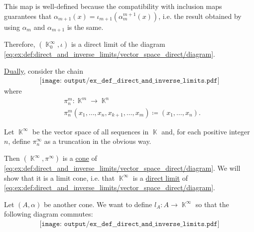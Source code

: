 \begin{example}
\begin{thmenum}
    This map is well-defined because the compatibility with inclusion maps guarantees that \( \alpha_{m+1}(x) = \iota_{m+1}(\alpha^{m+1}_m(x)) \), i.e. the result obtained by using \( \alpha_m \) and \( \alpha_{m+1} \) is the same.

    Therefore, \( (\BbbK_0^\infty, \iota) \) is a direct limit of the diagram \eqref{eq:ex:def:direct_and_inverse_limits/vector_space_direct/diagram}.

     \hyperref[thm:categorical_principle_of_duality]{Dually}, consider the chain
    \begin{equation}\label{eq:ex:def:direct_and_inverse_limits/vector_space_inverse/diagram}
      \begin{aligned}
        \texttt{[image: output/ex\_\_def\_\_direct\_and\_inverse\_limits.pdf]}
      \end{aligned}
    \end{equation}
    where
    \begin{equation*}
      \begin{aligned}
        &\pi_n^m: \BbbK^m \to \BbbK^n \\
        &\pi_n^m(x_1, \ldots, x_n, x_{k+1}, \ldots, x_m) \coloneqq (x_1, \ldots, x_n).
      \end{aligned}
    \end{equation*}

    Let \( \BbbK^\infty \) be the vector space of all sequences in \( \BbbK \) and, for each positive integer \( n \), define \( \pi_n^\infty \) as a truncation in the obvious way.

    Then \( (\BbbK^\infty, \pi^\infty) \) is a \hyperref[def:category_of_cones/cone]{cone} of \eqref{eq:ex:def:direct_and_inverse_limits/vector_space_direct/diagram}. We will show that it is a limit cone, i.e. that \( \BbbK^\infty \) is a \hyperref[def:direct_and_inverse_limits]{direct limit} of \eqref{eq:ex:def:direct_and_inverse_limits/vector_space_direct/diagram}.

    Let \( (A, \alpha) \) be another cone. We want to define \( l_A: A \to \BbbK^\infty \) so that the following diagram commutes:
    \begin{equation}\label{eq:ex:def:direct_and_inverse_limits/vector_space_inverse/limit}
      \begin{aligned}
        \texttt{[image: output/ex\_\_def\_\_direct\_and\_inverse\_limits.pdf]}
      \end{aligned}
    \end{equation}


\end{thmenum}
\end{example}
